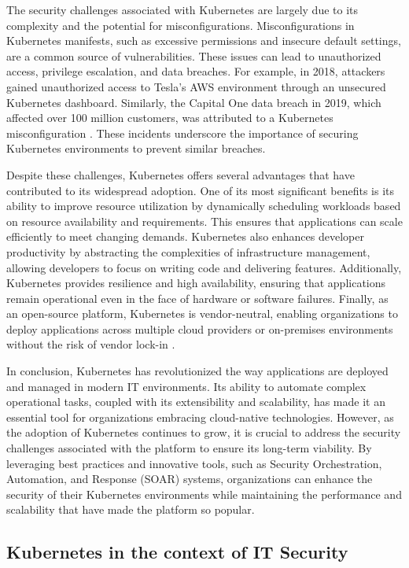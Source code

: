 The security challenges associated with Kubernetes are largely due to its complexity and the potential for misconfigurations. Misconfigurations in Kubernetes manifests, such as excessive permissions and insecure default settings, are a common source of vulnerabilities. These issues can lead to unauthorized access, privilege escalation, and data breaches. For example, in 2018, attackers gained unauthorized access to Tesla’s AWS environment through an unsecured Kubernetes dashboard. Similarly, the Capital One data breach in 2019, which affected over 100 million customers, was attributed to a Kubernetes misconfiguration \citeyear{shamim2021, khan2023}. These incidents underscore the importance of securing Kubernetes environments to prevent similar breaches.

Despite these challenges, Kubernetes offers several advantages that have contributed to its widespread adoption. One of its most significant benefits is its ability to improve resource utilization by dynamically scheduling workloads based on resource availability and requirements. This ensures that applications can scale efficiently to meet changing demands. Kubernetes also enhances developer productivity by abstracting the complexities of infrastructure management, allowing developers to focus on writing code and delivering features. Additionally, Kubernetes provides resilience and high availability, ensuring that applications remain operational even in the face of hardware or software failures. Finally, as an open-source platform, Kubernetes is vendor-neutral, enabling organizations to deploy applications across multiple cloud providers or on-premises environments without the risk of vendor lock-in \citeyear{carrion2023, nadaf2022}.

In conclusion, Kubernetes has revolutionized the way applications are deployed and managed in modern IT environments. Its ability to automate complex operational tasks, coupled with its extensibility and scalability, has made it an essential tool for organizations embracing cloud-native technologies. However, as the adoption of Kubernetes continues to grow, it is crucial to address the security challenges associated with the platform to ensure its long-term viability. By leveraging best practices and innovative tools, such as Security Orchestration, Automation, and Response (SOAR) systems, organizations can enhance the security of their Kubernetes environments while maintaining the performance and scalability that have made the platform so popular.

\subsection{Kubernetes in the context of IT Security}

